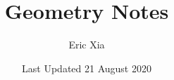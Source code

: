 \documentclass{article}
\title{Geometry Notes}
\author{Eric Xia}
\date{Last Updated 21 August 2020}
\begin{document}
    \maketitle
    \tableofcontents
    \pagebreak

\end{document}
